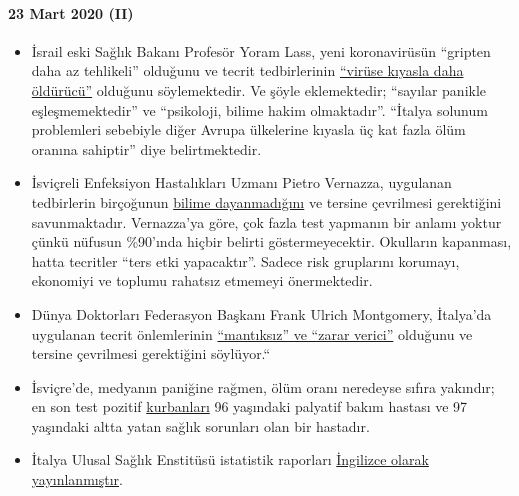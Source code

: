 \hypertarget{23-mart-2020-ii}{%
\paragraph{23 Mart 2020 (II)}\label{23-mart-2020-ii}}

\begin{itemize}
\tightlist
\item
  İsrail eski Sağlık Bakanı Profesör Yoram Lass, yeni koronavirüsün
  ``gripten daha az tehlikeli'' olduğunu ve tecrit tedbirlerinin
  \href{https://en.globes.co.il/en/article-lockdown-lunacy-1001322696}{``virüse
  kıyasla daha öldürücü''} olduğunu söylemektedir. Ve şöyle
  eklemektedir; ``sayılar panikle eşleşmemektedir'' ve ``psikoloji,
  bilime hakim olmaktadır''. ``İtalya solunum problemleri sebebiyle
  diğer Avrupa ülkelerine kıyasla üç kat fazla ölüm oranına sahiptir''
  diye belirtmektedir.
\item
  İsviçreli Enfeksiyon Hastalıkları Uzmanı Pietro Vernazza, uygulanan
  tedbirlerin birçoğunun
  \href{https://www.tagblatt.ch/leben/ostschweizer-infektiologe-pietro-vernazza-die-zahlen-zu-den-jungen-corona-virus-erkrankten-sind-irrefuehrend-ld.1206440}{bilime
  dayanmadığını} ve tersine çevrilmesi gerektiğini savunmaktadır.
  Vernazza'ya göre, çok fazla test yapmanın bir anlamı yoktur çünkü
  nüfusun \%90'ında hiçbir belirti göstermeyecektir. Okulların
  kapanması, hatta tecritler ``ters etki yapacaktır''. Sadece risk
  gruplarını korumayı, ekonomiyi ve toplumu rahatsız etmemeyi
  önermektedir.
\item
  Dünya Doktorları Federasyon Başkanı Frank Ulrich Montgomery, İtalya'da
  uygulanan tecrit önlemlerinin
  \href{https://www.general-anzeiger-bonn.de/news/politik/deutschland/interview-mit-weltaerztepraesident-montgomery-ueber-corona-pandemie-ist-chaos_aid-49609561}{``mantıksız''
  ve ``zarar verici''} olduğunu ve tersine çevrilmesi gerektiğini
  söylüyor.``
\item
  İsviçre'de, medyanın paniğine rağmen, ölüm oranı neredeyse sıfıra
  yakındır; en son test pozitif
  \href{https://www.bluewin.ch/de/newsregional/zuerich/1068-bestatigte-corona-falle-und-funf-todesfalle-im-kanton-zurich-371873.html}{kurbanları}
  96 yaşındaki palyatif bakım hastası ve 97 yaşındaki altta yatan sağlık
  sorunları olan bir hastadır.
\item
  İtalya Ulusal Sağlık Enstitüsü istatistik raporları
  \href{https://www.epicentro.iss.it/coronavirus/bollettino/Report-COVID-2019_20_marzo_eng.pdf}{İngilizce
  olarak yayınlanmıştır}.
\end{itemize}

